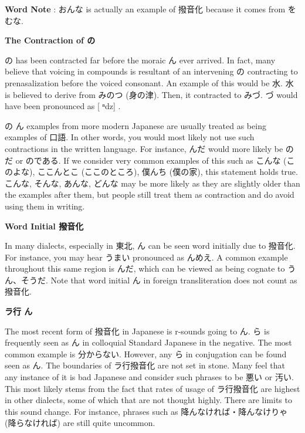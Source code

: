 \par{\textbf{Word Note }: おんな is actually an example of 撥音化 because it comes from をむな. }

\begin{center}
\textbf{The Contraction of の }
\end{center}

\par{ の has been contracted far before the moraic ん ever arrived. In fact, many believe that voicing in compounds is resultant of an intervening の contracting to prenasalization before the voiced consonant. An example of this would be 水. 水 is believed to derive from みのつ (身の津). Then, it contracted to みづ. づ would have been pronounced as [ ⁿdz] . }

\par{ の \textrightarrow  ん examples from more modern Japanese are usually treated as being examples of 口語. In other words, you would most likely not use such contractions in the written language. For instance, んだ would more likely be のだ or のである. If we consider very common examples of this such as こんな (このよな), ここんとこ (ここのところ), 僕んち (僕の家), this statement holds true. こんな, そんな, あんな, どんな may be more likely as they are slightly older than the examples after them, but people still treat them as contraction and do avoid using them in writing. }

\begin{center}
 \textbf{Word Initial 撥音化 }
\end{center}

\par{ In many dialects, especially in 東北, ん can be seen word initially due to 撥音化. For instance, you may hear うまい pronounced as んめえ. A common example throughout this same region is んだ, which can be viewed as being cognate to うん、そうだ. Note that word initial ん in foreign transliteration does not count as 撥音化. }

\begin{center}
 \textbf{ラ行 \textrightarrow  ん }
\end{center}

\par{ The most recent form of 撥音化 in Japanese is r-sounds going to ん. ら is frequently seen as ん in colloquial Standard Japanese in the negative. The most common example is 分からない. However, any ら in conjugation can be found seen as ん. The boundaries of ラ行撥音化 are not set in stone. Many feel that any instance of it is bad Japanese and consider such phrases to be 悪い or 汚い. This most likely stems from the fact that rates of usage of ラ行撥音化 are highest in other dialects, some of which that are not thought highly. There are limits to this sound change. For instance, phrases such as 降んなければ・降んなけりゃ (降らなければ) are still quite uncommon. }

